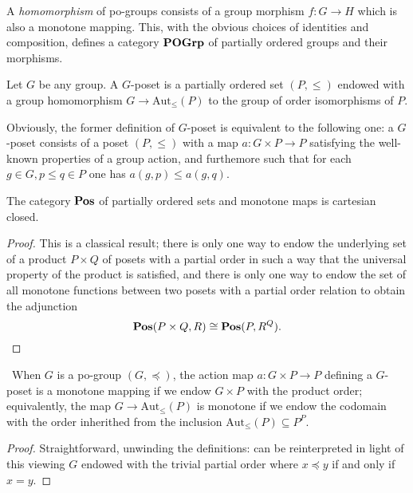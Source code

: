 \begin{definition}
A \emph{homomorphism} of po\hyp{}groups consists of a group morphism $f\colon G\to H$ which is also a monotone mapping. This, with the obvious choices of identities and composition, defines a category $\textbf{POGrp}$ of partially ordered groups and their morphisms.
\end{definition}
\begin{definition}\label{def:g.poset}
Let $G$ be any group. A $G$\hyp{}poset is a partially ordered set $(P, \le)$ endowed with a group homomorphism $G\to \text{Aut}_\le (P)$ to the group of order isomorphisms of $P$.
\end{definition}
\begin{remark}
Obviously, the former definition of $G$\hyp{}poset is equivalent to the following one: a $G$\hyp{}poset consists of a poset $(P,\le)$ with a map $a\colon G\times P\to P$ satisfying the well\hyp{}known properties of a group action, and furthemore such that for each $g\in G, p\le q\in P$ one has $a(g,p)\le a(g,q)$.
\end{remark}
\begin{lemma}
The category $\textbf{Pos}$ of partially ordered sets and monotone maps is cartesian closed.
\end{lemma}
\begin{proof}
This is a classical result; there is only one way to endow the underlying set of a product $P\times Q$ of posets with a partial order in such a way that the universal property of the product is satisfied, and there is only one way to endow the set of all monotone functions between two posets with a partial order relation to obtain the adjunction
\[
\textbf{Pos}(P\times Q, R)\cong \textbf{Pos}(P, R^Q).\qedhere
\]
\end{proof}
\begin{proposition}\
When $G$ is a po\hyp{}group $(G, \preceq)$, the action map $a\colon G\times P\to P$ defining a $G$\hyp{}poset is a monotone mapping if we endow $G\times P$ with the product order; equivalently, the map $G\to \text{Aut}_\le(P)$ is monotone if we endow the codomain with the order inherithed from the inclusion $\text{Aut}_\le(P)\subseteq  P^P$.
\end{proposition}
\begin{proof}
Straightforward, unwinding the definitions: \adef {} can be reinterpreted in light of this viewing $G$ endowed with the trivial partial order where $x\preceq y$ if and only if $x=y$.
\end{proof}
